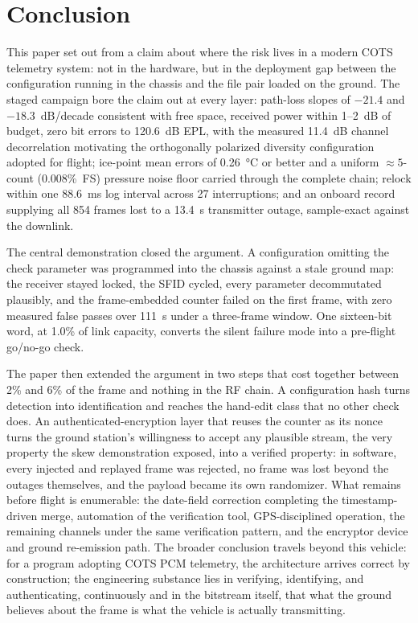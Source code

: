 \documentclass[12pt,letterpaper]{article}
\begin{document}
\section{Conclusion}

This paper set out from a claim about where the risk lives in a modern COTS telemetry
system: not in the hardware, but in the deployment gap between the configuration running in
the chassis and the file pair loaded on the ground. The staged campaign bore the claim out
at every layer: path-loss slopes of $-21.4$ and $-18.3$~dB/decade consistent with free
space, received power within 1--2~dB of budget, zero bit errors to 120.6~dB EPL, with the
measured 11.4~dB channel decorrelation motivating the orthogonally polarized diversity
configuration adopted for flight; ice-point mean errors of 0.26~\si{\celsius} or better and
a uniform ${\approx}5$-count (0.008\%~FS) pressure noise floor carried through the complete
chain; relock within one 88.6~ms log interval across 27 interruptions; and an onboard record
supplying all 854 frames lost to a 13.4~s transmitter outage, sample-exact against the
downlink.

The central demonstration closed the argument. A configuration omitting the check parameter
was programmed into the chassis against a stale ground map: the receiver stayed locked, the
SFID cycled, every parameter decommutated plausibly, and the frame-embedded counter failed
on the first frame, with zero measured false passes over 111~s under a three-frame window.
One sixteen-bit word, at 1.0\% of link capacity, converts the silent failure mode into a
pre-flight go/no-go check.

The paper then extended the argument in two steps that cost together between 2\% and 6\% of
the frame and nothing in the RF chain. A configuration hash turns detection into
identification and reaches the hand-edit class that no other check does. An
authenticated-encryption layer that reuses the counter as its nonce turns the ground
station's willingness to accept any plausible stream, the very property the skew
demonstration exposed, into a verified property: in software, every injected and replayed
frame was rejected, no frame was lost beyond the outages themselves, and the payload became
its own randomizer. What remains before flight is enumerable: the date-field correction
completing the timestamp-driven merge, automation of the verification tool, GPS-disciplined
operation, the remaining channels under the same verification pattern, and the encryptor
device and ground re-emission path. The broader conclusion travels beyond this vehicle: for
a program adopting COTS PCM telemetry, the architecture arrives correct by construction; the
engineering substance lies in verifying, identifying, and authenticating, continuously and
in the bitstream itself, that what the ground believes about the frame is what the vehicle
is actually transmitting.
\end{document}

